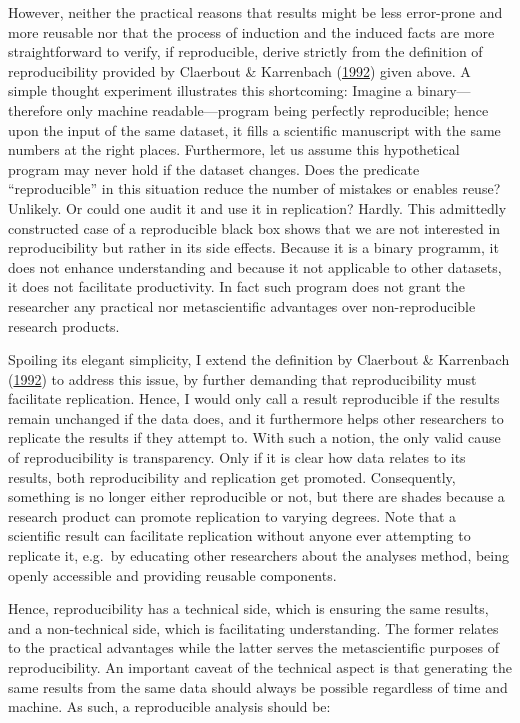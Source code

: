 \documentclass[12pt,a4paper,]{article}
\begin{document}
However, neither the practical reasons that results might be less error-prone and more reusable nor that the process of induction and the induced facts are more straightforward to verify, if reproducible, derive strictly from the definition of reproducibility provided by Claerbout \& Karrenbach (\protect\hyperlink{ref-claerboutElectronicDocumentsGive1992}{1992}) given above.
A simple thought experiment illustrates this shortcoming:
Imagine a binary---therefore only machine readable---program being perfectly reproducible; hence upon the input of the same dataset, it fills a scientific manuscript with the same numbers at the right places.
Furthermore, let us assume this hypothetical program may never hold if the dataset changes.
Does the predicate ``reproducible'' in this situation reduce the number of mistakes or enables reuse? Unlikely.
Or could one audit it and use it in replication? Hardly.
This admittedly constructed case of a reproducible black box shows that we are not interested in reproducibility but rather in its side effects.
Because it is a binary programm, it does not enhance understanding and because it not applicable to other datasets, it does not facilitate productivity.
In fact such program does not grant the researcher any practical nor metascientific advantages over non-reproducible research products.

Spoiling its elegant simplicity, I extend the definition by Claerbout \& Karrenbach (\protect\hyperlink{ref-claerboutElectronicDocumentsGive1992}{1992}) to address this issue, by further demanding that reproducibility must facilitate replication.
Hence, I would only call a result reproducible if the results remain unchanged if the data does, and it furthermore helps other researchers to replicate the results if they attempt to.
With such a notion, the only valid cause of reproducibility is transparency.
Only if it is clear how data relates to its results, both reproducibility and replication get promoted.
Consequently, something is no longer either reproducible or not, but there are shades because a research product can promote replication to varying degrees.
Note that a scientific result can facilitate replication without anyone ever attempting to replicate it, e.g.~by educating other researchers about the analyses method, being openly accessible and providing reusable components.

Hence, reproducibility has a technical side, which is ensuring the same results, and a non-technical side, which is facilitating understanding.
The former relates to the practical advantages while the latter serves the metascientific purposes of reproducibility.
An important caveat of the technical aspect is that generating the same results from the same data should always be possible regardless of time and machine.
As such, a reproducible analysis should be:
\end{document}
